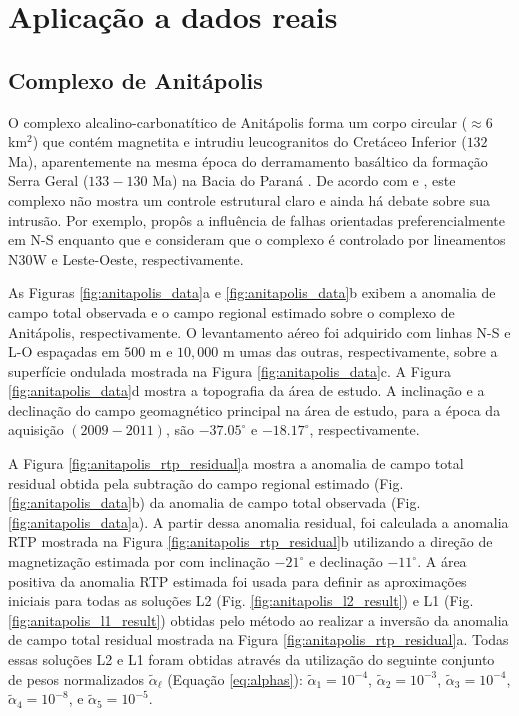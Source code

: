 \chapter{Aplicação a dados reais}


\section{Complexo de Anitápolis}
\label{subsec:anitapolis_complex}


O complexo alcalino-carbonatítico de Anitápolis forma um corpo circular 
($\approx 6$ km$^{2}$) que contém magnetita e intrudiu leucogranitos do Cretáceo Inferior ($132$ Ma), aparentemente na mesma época do derramamento basáltico da formação Serra Geral ($133-130$ Ma) na Bacia do Paraná \citep{scheibe_etal2005, gomes_etal2018}. 
De acordo com \citet{riccomini_etal2005} e \citet{gomes_etal2018}, 
este complexo não mostra um controle estrutural claro e ainda há debate sobre sua intrusão. 
Por exemplo, \citet{melcher_coutinho1966} propôs a influência de falhas orientadas preferencialmente em N-S
enquanto que \citet{horbach_marimon1980} e \citet{scheibe_etal2005} consideram que o complexo é controlado por lineamentos N30W e Leste-Oeste, respectivamente.

As Figuras \ref{fig:anitapolis_data}a e \ref{fig:anitapolis_data}b exibem a anomalia de campo total observada e o campo regional estimado sobre o complexo de Anitápolis, respectivamente.
O levantamento aéreo foi adquirido com linhas N-S e L-O espaçadas em $500$ m e $10,000$ m umas das outras, respectivamente, sobre a superfície ondulada mostrada na Figura \ref{fig:anitapolis_data}c. 
A Figura \ref{fig:anitapolis_data}d mostra a topografia da área de estudo.
A inclinação e a declinação do campo geomagnético principal na área de estudo, para a época da aquisição $(2009-2011)$, são $-37.05^{\circ}$ e 
$-18.17^{\circ}$, respectivamente.

A Figura \ref{fig:anitapolis_rtp_residual}a mostra a anomalia de campo total residual obtida pela subtração do campo regional estimado (Fig. \ref{fig:anitapolis_data}b)
da anomalia de campo total observada (Fig. \ref{fig:anitapolis_data}a).
A partir dessa anomalia residual, foi calculada a anomalia RTP mostrada na Figura \ref{fig:anitapolis_rtp_residual}b utilizando a direção de magnetização estimada por \citet{reis_etal2019} com inclinação $-21^{\circ}$ e declinação $-11^{\circ}$.
A área positiva da anomalia RTP estimada foi usada para definir as aproximações iniciais para todas as soluções L2 (Fig. \ref{fig:anitapolis_l2_result}) e L1 
(Fig. \ref{fig:anitapolis_l1_result}) obtidas pelo método ao realizar a inversão da anomalia de campo total residual mostrada na Figura \ref{fig:anitapolis_rtp_residual}a.
Todas essas soluções L2 e L1 foram obtidas através da utilização do seguinte conjunto de pesos normalizados $\tilde{\alpha}_{\ell}$ (Equação \ref{eq:alphas}):
$\tilde{\alpha}_{1} = 10^{-4}$, $\tilde{\alpha}_{2} = 10^{-3}$, 
$\tilde{\alpha}_{3} = 10^{-4}$, $\tilde{\alpha}_{4} = 10^{-8}$, e 
$\tilde{\alpha}_{5} = 10^{-5}$.

